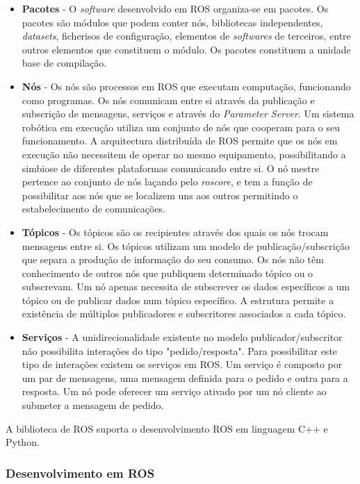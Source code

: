 \begin{itemize}
	\item \textbf{Pacotes} - O \textit{software} desenvolvido em ROS organiza-se em pacotes. Os pacotes são módulos que podem conter nós, bibliotecas independentes, \textit{datasets}, ficherisos de configuração, elementos de \textit{softwares} de terceiros, entre outros elementos que constituem o módulo. Os pacotes constituem a unidade base de compilação.
	\item \textbf{Nós} - Os nós são processos em ROS que executam computação, funcionando como programas. Os nós comunicam entre si através da publicação e subscrição de mensagens, serviços e através do \textit{Parameter Server}. Um sistema robótica em execução utiliza um conjunto de nós que cooperam para o seu funcionamento. A arquitectura distribuída de ROS permite que os nós em execução não necessitem de operar no mesmo equipamento, possibilitando a simbiose de diferentes plataformas comunicando entre si. O nó mestre pertence ao conjunto de nós laçando pelo \textit{roscore}, e tem a função de possibilitar aos nós que se localizem uns aos outros permitindo o estabelecimento de comunicações. 
	\item \textbf{Tópicos} - Os tópicos são os recipientes através dos quais os nós trocam mensagens  entre si. Os tópicos utilizam um modelo de publicação/subscrição que separa a produção de informação do seu consumo. Os nós não têm conhecimento de outros nós que publiquem determinado tópico ou o subscrevam. Um nó apenas necessita de subscrever os dados específicos a um tópico ou de publicar dados num tópico específico. A estrutura permite a existência de múltiplos publicadores e subscritores associados a cada tópico.
	\item \textbf{Serviços} - A unidirecionalidade existente no modelo publicador/subscritor não possibilita interações do tipo "pedido/resposta". Para possibilitar este tipo de interações existem os serviços em ROS. Um serviço é composto por um par de mensagens, uma mensagem definida para o pedido e outra para a resposta. Um nó pode oferecer um serviço ativado por um nó cliente ao submeter a mensagem de pedido.
 
\end{itemize}

A biblioteca de ROS suporta o desenvolvimento ROS em linguagem C++ e Python.

\subsubsection{Desenvolvimento em ROS}

